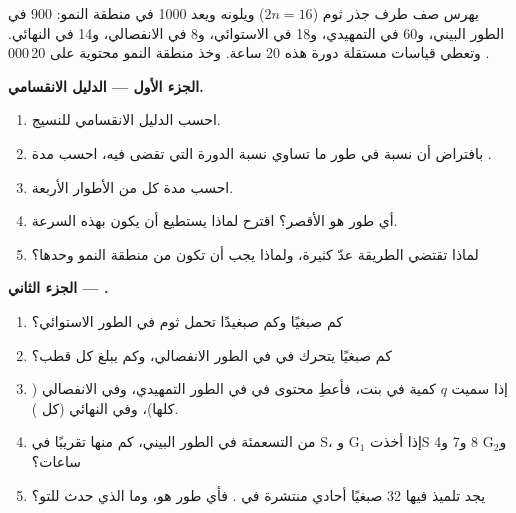 \begin{problem}
\label{pb:g11:cell-cycle-mitosis:1}
يهرس صف طرف جذر ثوم ($2n = 16$) ويلونه ويعد 1000  في منطقة النمو:
900 في الطور البيني، و60 في التمهيدي، و18 في الاستوائي، و8 في
الانفصالي، و14 في النهائي. وتعطي قياسات مستقلة دورة هذه  20
ساعة. وخذ منطقة النمو محتوية على 20\,000 .

\medskip
\noindent\textbf{الجزء الأول --- الدليل الانقسامي.}
\begin{enumerate}
  \item احسب الدليل الانقسامي للنسيج.
  \item بافتراض أن نسبة  في طور ما تساوي نسبة الدورة التي تقضى
        فيه، احسب مدة .
  \item احسب مدة كل من الأطوار الأربعة.
  \item أي طور هو الأقصر؟ اقترح لماذا يستطيع أن يكون بهذه السرعة.
  \item لماذا تقتضي الطريقة عدّ  كثيرة، ولماذا يجب أن تكون من
        منطقة النمو وحدها؟
\end{enumerate}

\medskip
\noindent\textbf{الجزء الثاني ---  .}
\begin{enumerate}[resume]
  \item كم صبغيًا وكم صبغيدًا تحمل  ثوم في الطور الاستوائي؟
  \item كم صبغيًا يتحرك في  في الطور الانفصالي، وكم يبلغ كل قطب؟
  \item إذا سميت $q$ كمية  في  بنت، فأعطِ محتوى  في  في
        الطور التمهيدي، وفي الانفصالي ( كلها)، وفي النهائي (كل
        ).
  \item من  التسعمئة في الطور البيني، كم منها تقريبًا في S، إذا
        أخذت $\mathrm{G_1}$ وS و$\mathrm{G_2}$ 8 و7 و4 ساعات؟
  \item يجد تلميذ  فيها 32 صبغيًا أحادي  منتشرة في
        . فأي طور هو، وما الذي حدث للتو؟
\end{enumerate}


\end{problem}
